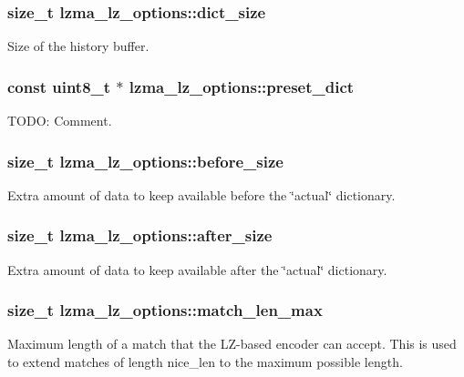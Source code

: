 \subsubsection[{dict\-\_\-size}]{\setlength{\rightskip}{0pt plus 5cm}size\-\_\-t lzma\-\_\-lz\-\_\-options\-::dict\-\_\-size}\label{structlzma__lz__options_a72267f1a6f21d8b51c999b7a1ddc9ab4}


Size of the history buffer. 

\subsubsection[{preset\-\_\-dict}]{\setlength{\rightskip}{0pt plus 5cm}const uint8\-\_\-t $\ast$ lzma\-\_\-lz\-\_\-options\-::preset\-\_\-dict}\label{structlzma__lz__options_a01750e9cb71e4ea7fc7c9518326af3ba}


T\-O\-D\-O\-: Comment. 

\subsubsection[{before\-\_\-size}]{\setlength{\rightskip}{0pt plus 5cm}size\-\_\-t lzma\-\_\-lz\-\_\-options\-::before\-\_\-size}\label{structlzma__lz__options_ac9ddbac2942fdffb60512d66331cb527}
Extra amount of data to keep available before the \char`\"{}actual\char`\"{} dictionary. 
\subsubsection[{after\-\_\-size}]{\setlength{\rightskip}{0pt plus 5cm}size\-\_\-t lzma\-\_\-lz\-\_\-options\-::after\-\_\-size}\label{structlzma__lz__options_a0d3e130ba60fab1c0b682caa7abe15a7}
Extra amount of data to keep available after the \char`\"{}actual\char`\"{} dictionary. 
\subsubsection[{match\-\_\-len\-\_\-max}]{\setlength{\rightskip}{0pt plus 5cm}size\-\_\-t lzma\-\_\-lz\-\_\-options\-::match\-\_\-len\-\_\-max}\label{structlzma__lz__options_a3923a9ac746074ec4cb3aacd8acd2771}
Maximum length of a match that the L\-Z-\/based encoder can accept. This is used to extend matches of length nice\-\_\-len to the maximum possible length. 
